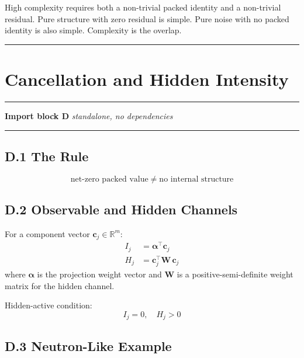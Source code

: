 \documentclass[11pt, a4paper, oneside]{article}
\theoremstyle{definition}
\theoremstyle{plain}
\theoremstyle{remark}
\begin{document}
High complexity requires both a non-trivial packed identity and a
non-trivial residual. Pure structure with zero residual is simple.
Pure noise with no packed identity is also simple. Complexity is the
overlap.

\noindent\rule{\linewidth}{0.4pt}

\section{Cancellation and Hidden Intensity}
\label{sec:cancellation}

\noindent\rule{\linewidth}{0.8pt}
\textbf{Import block D} \hfill \textit{standalone, no dependencies}
\noindent\rule{\linewidth}{0.4pt}

\subsection*{D.1 The Rule}

\begin{equation}
  \boxed{
	\text{net-zero packed value}
	\;\neq\;
	\text{no internal structure}
  }
  \tag{D.1}
\end{equation}

\subsection*{D.2 Observable and Hidden Channels}

For a component vector $\mathbf{c}_j \in \mathbb{R}^m$:
\begin{align}
  I_j &= \bm{\alpha}^\top \mathbf{c}_j
  \tag{D.2} \\
  H_j &= \mathbf{c}_j^\top \mathbf{W}\, \mathbf{c}_j
  \tag{D.3}
\end{align}
where $\bm{\alpha}$ is the projection weight vector and $\mathbf{W}$ is a
positive-semi-definite weight matrix for the hidden channel.

Hidden-active condition:
\begin{equation}
  I_j = 0, \quad H_j > 0
  \tag{D.4}
\end{equation}

\subsection*{D.3 Neutron-Like Example}
\end{document}
